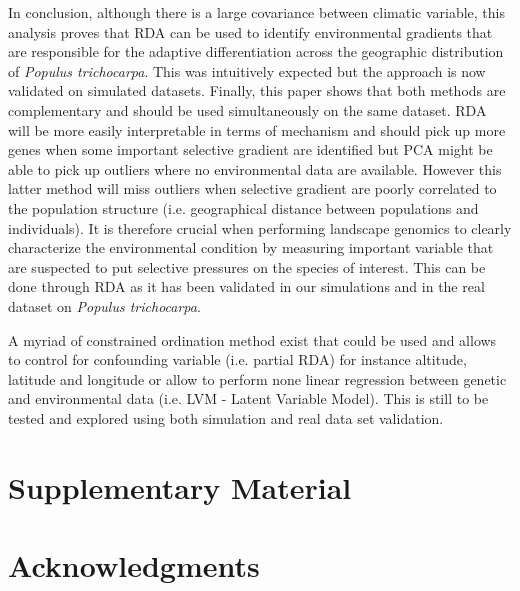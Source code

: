 \documentclass[a4paper,times,10pt,authoryear]{article}%
\begin{document}
In conclusion, although there is a large covariance between climatic variable, this analysis proves that RDA can be used to identify environmental gradients that are responsible for the adaptive differentiation across the geographic distribution of \textit{Populus trichocarpa}. This was intuitively expected but the approach is now validated on simulated datasets.
Finally, this paper shows that both methods are complementary and should be used simultaneously on the same dataset. RDA will be more easily interpretable in terms of mechanism and should pick up more genes when some important selective gradient are identified but PCA might be able to pick up outliers where no environmental data are available. However this latter method will miss outliers when selective gradient are poorly correlated to the population structure (i.e. geographical distance between populations and individuals). It is therefore crucial when performing landscape genomics to clearly characterize the environmental condition by measuring important variable that are suspected to put selective pressures on the species of interest. This can be done through RDA as it has been validated in our simulations and in the real dataset on \textit{Populus trichocarpa}. 

A myriad of constrained ordination method exist that could be used and allows to control for confounding variable (i.e. partial RDA) for instance altitude, latitude and longitude or allow to perform none linear regression between genetic and environmental data (i.e. LVM - Latent Variable Model). This is still to be tested and explored using both simulation and real data set validation.


\section{Supplementary Material}


\section{Acknowledgments}



\end{document}
